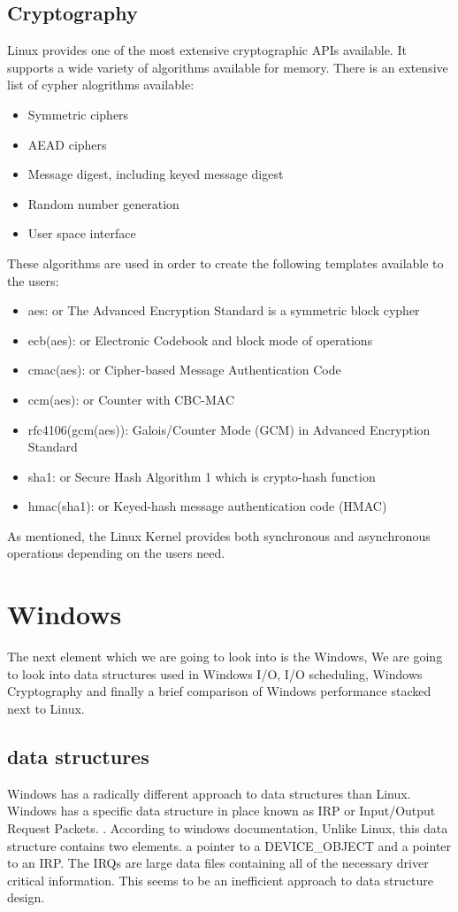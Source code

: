 \documentclass[journal,10pt,onecolumn,compsoc,letterpaper,draftclsnofoot,table,xcdraw]{IEEEtran} \usepackage[margin=0.75in]{geometry}
\begin{document}
\subsection{Cryptography}
\noindent Linux provides one of the most extensive cryptographic APIs available. It supports a wide variety of algorithms available for memory. There is an extensive list of cypher alogrithms available: \cite{5}
\begin{itemize}
\item Symmetric ciphers
\item AEAD ciphers
\item Message digest, including keyed message digest
\item Random number generation
\item User space interface
\end{itemize}
\noindent These algorithms are used in order to create the following templates available to the users: \cite{6}
\begin{itemize}
\item aes: or The Advanced Encryption Standard is a symmetric block cypher
\item ecb(aes): or Electronic Codebook and block mode of operations
\item cmac(aes): or Cipher-based Message Authentication Code
\item ccm(aes): or  Counter with CBC-MAC
\item rfc4106(gcm(aes)): Galois/Counter Mode (GCM) in Advanced Encryption Standard
\item sha1: or Secure Hash Algorithm 1 which is crypto-hash function
\item hmac(sha1): or Keyed-hash message authentication code (HMAC) 
\end{itemize}
\noindent As mentioned, the Linux Kernel provides both synchronous and asynchronous operations depending on the users need.
\section{Windows}
\noindent The next element which we are going to look into is the Windows, We are going to look into data structures used in Windows I/O, I/O scheduling, Windows Cryptography and finally a brief comparison of Windows performance stacked next to Linux.
\subsection{data structures}
\noindent Windows has a radically different approach to data structures than Linux. Windows has a specific data structure in place known as IRP or Input/Output Request Packets. \cite{7}. According to windows documentation, Unlike Linux, this data structure contains two elements. a pointer to a DEVICE\_OBJECT and a pointer to an IRP. The IRQs are large data files containing all of the necessary driver critical information. This seems to be an inefficient approach to data structure design.
\end{document}
